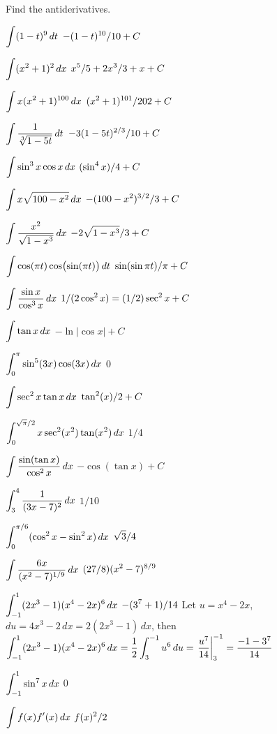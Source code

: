 \exercises

Find the antiderivatives.


\twocol

\exercise $\displaystyle\int (1-t)^9\,dt$
\answer $\displaystyle -(1-t)^{10}/10+C$
\endanswer
\endexercise

\exercise $\displaystyle\int (x^2+1)^2\,dx$
\answer $\displaystyle x^5/5+2x^3/3+x+C$
\endanswer
\endexercise

\exercise $\displaystyle\int x(x^2+1)^{100}\,dx$
\answer $\displaystyle (x^2+1)^{101}/202+C$
\endanswer
\endexercise

\exercise $\ds\int {1\over\root 3 \of {1-5t}}\,dt$ 
\answer $\displaystyle -3(1-5t)^{2/3}/10+C$
\endanswer
\endexercise

\exercise $\displaystyle\int \sin^3x\cos x\,dx$
\answer $\displaystyle (\sin^4x)/4+C$
\endanswer
\endexercise

\exercise $\displaystyle\int x\sqrt{100-x^2}\,dx$
\answer $\displaystyle -(100-x^2)^{3/2}/3+C$
\endanswer
\endexercise

\exercise $\displaystyle\int {x^2\over\sqrt{1-x^3}}\,dx$
\answer $\displaystyle \displaystyle -2\sqrt{1-x^3}/3+C$
\endanswer
\endexercise

\exercise $\displaystyle\int \cos(\pi t)\cos\bigl(\sin(\pi t)\bigr)\,dt$
\answer $\displaystyle \sin(\sin\pi t)/\pi+C$
\endanswer
\endexercise

\exercise $\displaystyle\int {\sin x\over\cos^3 x}\,dx$
\answer $\displaystyle \displaystyle 1/(2\cos^2 x)=(1/2)\sec^2x+C$
\endanswer
\endexercise

\exercise $\displaystyle\int\tan x\,dx$
\answer $-\ln|\cos x|+C$
\endanswer
\endexercise

\exercise  $\displaystyle\int_0^\pi\sin^5(3x)\cos(3x)\,dx$
\answer $0$
\endanswer
\endexercise

\exercise $\displaystyle\int\sec^2x\tan x\,dx$
\answer $\displaystyle \tan^2(x)/2+C$
\endanswer
\endexercise

\exercise $\displaystyle\int_0^{\sqrt{\pi}/2} x\sec^2(x^2)\tan(x^2)\,dx$
\answer $1/4$
\endanswer
\endexercise

\exercise $\displaystyle\int {\sin(\tan x)\over\cos^2x}\,dx$
\answer $-\cos(\tan x)+C$
\endanswer
\endexercise

\exercise $\displaystyle\int_3^4 {1\over(3x-7)^2}\,dx$
\answer $1/10$
\endanswer
\endexercise

\exercise $\displaystyle\int_0^{\pi/6}(\cos^2x - \sin^2x)\,dx$
\answer $\displaystyle \sqrt3/4$
\endanswer
\endexercise

\exercise $\displaystyle\int {6x\over(x^2 - 7)^{1/9}}\,dx$
\answer $\displaystyle (27/8)(x^2-7)^{8/9}$
\endanswer
\endexercise

\exercise $\displaystyle\int_{-1}^1 (2x^3-1)(x^4-2x)^6\,dx$
\answer $\displaystyle -(3^7+1)/14$
\endanswer
\solution Let $u=x^4-2x$, $du=4x^3-2\,dx=2(2x^3-1)\,dx$, then
$\displaystyle\int_{-1}^1
(2x^3-1)(x^4-2x)^6\,dx={1\over2}\int_3^{-1}u^6\,du=\left.{u^7\over14}\right|_3^{-1}=
{-1-3^7\over14}$
\endsolution
\endexercise

\exercise $\displaystyle\int_{-1}^1 \sin^7 x\,dx$
\answer $0$
\endanswer
\endexercise

\exercise $\displaystyle\int f(x) f'(x)\,dx$ 
\answer $\displaystyle f(x)^2/2$
\endanswer

\endtwocol
\endexercise

\endexercises

